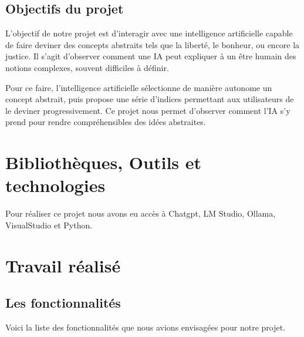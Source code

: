 \documentclass[a4paper, 12pt, twoside]{article}
\begin{document}
	\subsection{ Objectifs du projet}
 L’objectif de notre projet est d’interagir avec une intelligence artificielle capable de faire deviner des concepts abstraits tels que la liberté, le bonheur, ou encore la justice. Il s’agit d’observer comment une IA peut expliquer à un être humain des notions complexes, souvent difficiles à définir.

 
Pour ce faire, l’intelligence artificielle sélectionne de manière autonome un concept abstrait, puis propose une série d’indices permettant aux utilisateurs de le deviner progressivement. Ce projet nous permet d’observer comment l’IA s’y prend pour rendre compréhensibles des idées abstraites.
   

\section{Bibliothèques, Outils et technologies}
Pour réaliser ce projet nous avons eu accès à Chatgpt,  LM Studio, Ollama, VisualStudio et Python.

\section{Travail réalisé}
      \subsection{Les fonctionnalités}

Voici la liste des fonctionnalités que nous avions envisagées pour notre projet.
\end{document}
